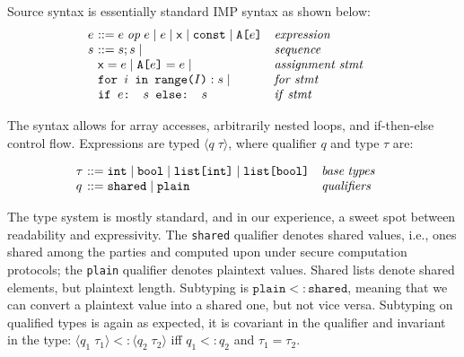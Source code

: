 Source syntax is essentially standard IMP syntax as shown below:
{\small
\[
\begin{array}{l@{~~~~~}l}
  \begin{array}{l@{~}l@{~~~}l}
 e & ::= e \; \mathit{op} \; e \mid e \mid \x \mid  \texttt{const} \mid \texttt{A[$e$]} & \mathit{expression} \\
  s & ::= s;s \mid  & \mathit{sequence} \\
  & \x = e \mid \texttt{A[$e$]} = e \mid & \mathit{assignment \; stmt} \\
  & \texttt{for $i$ in range($I$)}: s \mid & \mathit{for \; stmt} \\
  & \texttt{if $e$: $s$ else: $s$} & \mathit{if \; stmt} \\

  \end{array}
\end{array}
\]
}

The syntax allows for array accesses, arbitrarily nested loops, and if-then-else control flow.
Expressions are typed $\langle q \; \tau\rangle$, where qualifier $q$ and type $\tau$ are:

{\small
\[
\begin{array}{l@{~~~~~}l}
  \begin{array}{l@{~}l@{~~~}l}
 \tau & ::= \texttt{int}  \mid \texttt{bool} \mid \texttt{list[int]} \mid  \texttt{list[bool]} & \mathit{base \; types} \\
  q & ::= \texttt{shared} \mid \texttt{plain} & \mathit{qualifiers} \\
  \end{array}
\end{array}
\]
}

The type system is mostly standard, and in our experience, a sweet spot between readability and expressivity.
The \texttt{shared} qualifier denotes shared values, i.e., ones shared among the parties and computed upon
under secure computation protocols; the \texttt{plain} qualifier denotes plaintext values.
Shared lists denote shared elements, but plaintext length. Subtyping is
$\texttt{plain} <: \texttt{shared}$, meaning that we can convert a plaintext value into a shared one,
but not vice versa. Subtyping on qualified types is again as expected, it is covariant in the qualifier
and invariant in the type: $\langle q_1 \; \tau_1 \rangle <: \langle q_2 \; \tau_2 \rangle$
iff $q_1 <: q_2$ and  $\tau_1 = \tau_2$.

